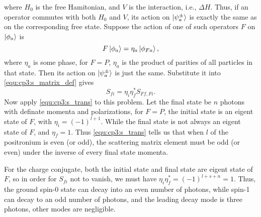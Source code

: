 \begin{problembody}
    where $H_0$ is the free Hamitonian, and $V$ is the interaction, i.e., $\Delta H$. Thus, if an operator commutes
    with both $H_0$ and $V$, its action on $\left|\psi^\pm_a\right\rangle$ is exactly the same as on the corresponding free state.
    Suppose the action of one of such operators $F$ on $\left|\phi_a\right\rangle$ is
    \begin{equation*}
        F\left|\phi_a\right\rangle = \eta_a\left|\phi_{Fa}\right\rangle,
    \end{equation*}
    where $\eta_a$ is some phase, for $F = P$, $\eta_a$ is the product of parities of all particles in that state. Then 
    its action on $\left|\psi^\pm_a\right\rangle$ is just the same. Substitute it into \eqref{equ:cp3:s_matrix_def} gives
    \begin{equation}\label{equ:cp3:s_trans}
        S_{fi} = \eta_i \eta_f^\ast S_{Ff, Fi}.
    \end{equation}
    Now apply \eqref{equ:cp3:s_trans} to this problem. Let the final state be $n$ photons with definate momenta and polarizations,
    for $F = P$, the initial state is an eigent state of $F$, with $\eta_i = (-1)^{l + 1}$. While the final state is not 
    always an eigent state of $F$, and $\eta_f = 1$. Thus \eqref{equ:cp3:s_trans} tells us that when $l$ of the positronium is
    even (or odd), the scattering matrix element must be odd (or even) under the inverse of every final state momenta. 

    For the charge conjugate, both the initial state and final state are eigent state of $F$, so in order for $S_{fi}$ not to vanish,
    we must have $\eta_i \eta_f^\ast = (-1)^{l + s + n} = 1$. Thus, the ground spin-0 state can decay into an even number of photons, 
    while spin-1 can decay to an odd number of photons, and the leading decay mode is three photons, other modes are negligible.
\end{problembody}